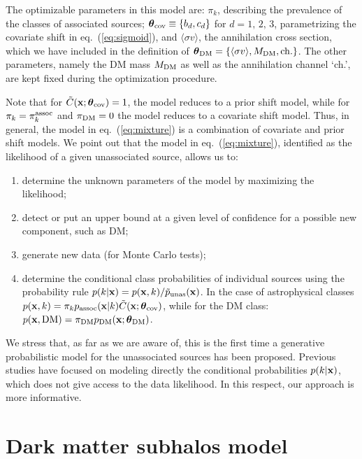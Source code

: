 \documentclass[12pt, a4paper]{article}
\newcommand{\ben}{\begin{enumerate}}
\newcommand{\een}{\end{enumerate}}
\newcommand{\bx}{{\bf x}}
\newcommand{\btheta}{\boldsymbol{\theta}}
\newcommand{\sigmav}{\langle \sigma v \rangle}
\newcommand{\mdm}{{M_{\rm DM}}}
\begin{document}
The optimizable parameters in this model are: $\pi_k$, describing the prevalence of the classes of associated sources; $\btheta_{\rm cov}\equiv\{b_d,c_d\}$ for $d = 1,\,2,\,3$, parametrizing the covariate shift in eq.~(\ref{eq:sigmoid}), and $\sigmav$, the annihilation cross section, which we have included in the definition of $\btheta_{\rm DM}=\{\sigmav,\mdm,{\rm ch.}\}$. The other parameters, namely the DM mass $\mdm$ as well as the annihilation channel `ch.', are kept fixed during the optimization procedure.

Note that for $\tilde{C}(\bx; \btheta_{\rm cov}) = 1$, the model reduces to a prior shift model, while for $\pi_k = \pi_k^{\rm assoc}$ and $\pi_{\rm DM} = 0$ the model reduces to a covariate shift model.
Thus, in general, the model in eq.~(\ref{eq:mixture}) is a combination of covariate and prior shift models. We point out that the model in eq.~(\ref{eq:mixture}), identified as the likelihood of a given unassociated source, allows us to:
\ben
\item
determine the unknown parameters of the model by maximizing the likelihood;
\item
detect or put an upper bound at a given level of confidence for a possible new component, such as DM;
\item
generate new data (for Monte Carlo tests);
\item
determine the conditional class probabilities of individual sources using the probability rule
$p(k|\bx) = p(\bx, k)/\tilde{p}_{\rm unas}(\bx)$. In the case of astrophysical classes 
$p(\bx, k) = \pi_k p_{\rm assoc}(\bx|k) \tilde{C}(\bx; \btheta_{\rm cov})$, while
for the DM class: $p(\bx, {\rm DM}) = \pi_{\rm DM} p_{\rm DM}(\bx; \btheta_{\rm DM})$.
\een

We stress that, as far as we are aware of, this is the first time a generative probabilistic model for the unassociated sources has been proposed. Previous studies have focused on modeling directly the conditional probabilities $p(k|\bx)$, which does not give access to the data likelihood. In this respect, our approach is more informative.

\section{Dark matter subhalos model}
\label{sec:DM_model_chapter}
\end{document}

